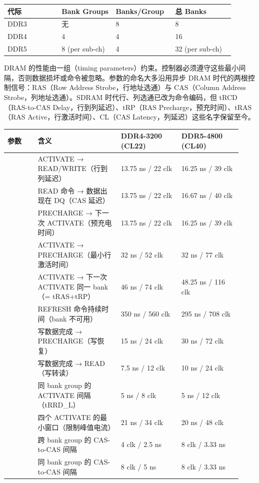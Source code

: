\begin{longtable}{L{0.22\linewidth}L{0.22\linewidth}L{0.22\linewidth}L{0.24\linewidth}}
\toprule
代际 & Bank Groups & Banks/Group & 总 Banks \\
\midrule
DDR3 & 无 & 8 & 8 \\
DDR4 & 4 & 4 & 16 \\
DDR5 & 8 (per sub-ch) & 4 & 32 (per sub-ch) \\
\bottomrule
\end{longtable}


DRAM 的性能由一组（timing parameters）约束。控制器必须遵守这些最小间隔，否则数据损坏或命令被忽略。参数的命名大多沿用异步 DRAM 时代的两根控制信号：RAS（Row Address Strobe，行地址选通）与 CAS（Column Address Strobe，列地址选通）。SDRAM 时代行、列选通已改为命令编码，但 tRCD（RAS-to-CAS Delay，行到列延迟）、tRP（RAS Precharge，预充时间）、tRAS（RAS Active，行激活时间）、CL（CAS Latency，列延迟）这些名字保留至今。

\begin{longtable}{L{0.12\linewidth}L{0.33\linewidth}L{0.24\linewidth}L{0.24\linewidth}}
\toprule
参数 & 含义 & DDR4-3200 (CL22) & DDR5-4800 (CL40) \\
\midrule
{} & ACTIVATE → READ/WRITE（行到列延迟） & 13.75 ns / 22 clk & 16.25 ns / 39 clk \\
 & READ 命令 → 数据出现在 DQ（CAS 延迟） & 13.75 ns / 22 clk & 16.67 ns / 40 clk \\
 & PRECHARGE → 下一次 ACTIVATE（预充电时间） & 13.75 ns / 22 clk & 16.25 ns / 39 clk \\
 & ACTIVATE → PRECHARGE（最小行激活时间） & 32 ns / 52 clk & 32 ns / 77 clk \\
 & ACTIVATE → 下一次 ACTIVATE 同一 bank（= tRAS+tRP） & 46 ns / 74 clk & 48.25 ns / 116 clk \\
 & REFRESH 命令持续时间（bank 不可用） & 350 ns / 560 clk & 295 ns / 708 clk \\
 & 写数据完成 → PRECHARGE（写恢复） & 15 ns / 24 clk & 30 ns / 72 clk \\
 & 写数据完成 → READ（写转读） & 7.5 ns / 12 clk & 10 ns / 24 clk \\
 & 同 bank group 的 ACTIVATE 间隔（tRRD\_L） & 5 ns / 8 clk & 5 ns / 12 clk \\
 & 四个 ACTIVATE 的最小窗口（限制峰值电流） & 21 ns / 34 clk & 20 ns / 48 clk \\
 & 跨 bank group 的 CAS-to-CAS 间隔 & 4 clk / 2.5 ns & 8 clk / 3.33 ns \\
 & 同 bank group 的 CAS-to-CAS 间隔 & 8 clk / 5 ns & 8 clk / 3.33 ns \\
\bottomrule
\end{longtable}

